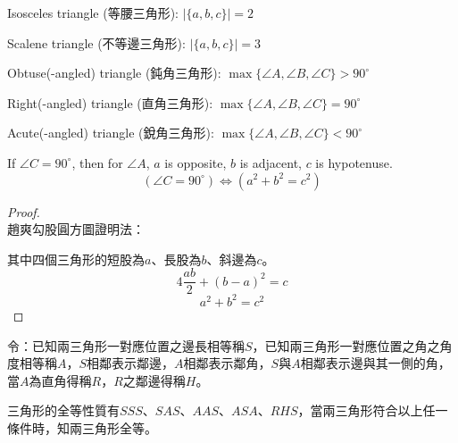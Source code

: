 \documentclass[a4paper,12pt]{report}
\begin{document}
\item Isosceles triangle (等腰三角形): $|\{a,b,c\}|=2$
\item Scalene triangle (不等邊三角形): $|\{a,b,c\}|=3$
\item Obtuse(-angled) triangle (鈍角三角形): $\max\{\angle A,\angle B,\angle C\}>90^\circ$
\item Right(-angled) triangle (直角三角形): $\max\{\angle A,\angle B,\angle C\}=90^\circ$
\item Acute(-angled) triangle (銳角三角形): $\max\{\angle A,\angle B,\angle C\}<90^\circ$
\item 
\eit
{}
If $\angle C=90^\circ$, then for $\angle A$, $a$ is opposite, $b$ is adjacent, $c$ is hypotenuse.
\[(\angle C=90^\circ)\iff (a^2+b^2=c^2)\]
\begin{proof}\mbox{}\\
趙爽勾股圓方圖證明法：
\begin{center}
\end{center}
其中四個三角形的短股為$a$、長股為$b$、斜邊為$c$。
\[4\frac{ab}{2}+(b-a)^2=c\]
\[a^2+b^2=c^2\]
\end{proof}
令：已知兩三角形一對應位置之邊長相等稱$S$，已知兩三角形一對應位置之角之角度相等稱$A$，$S$相鄰表示鄰邊，$A$相鄰表示鄰角，$S$與$A$相鄰表示邊與其一側的角，當$A$為直角得稱$R$，$R$之鄰邊得稱$H$。

三角形的全等性質有$SSS$、$SAS$、$AAS$、$ASA$、$RHS$，當兩三角形符合以上任一條件時，知兩三角形全等。
\end{document}
